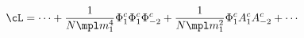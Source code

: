 \begin{equation}
\cL = \cdots + \frac{1}{N \mpl m_1^4} \Phi_1^c \Phi_1^c \Phi_{-2}^c+
\frac{1}{N \mpl m_1^2} \Phi^c_1 A^c_1 A^c_{-2} + \cdots \label{cnint}
\end{equation}

